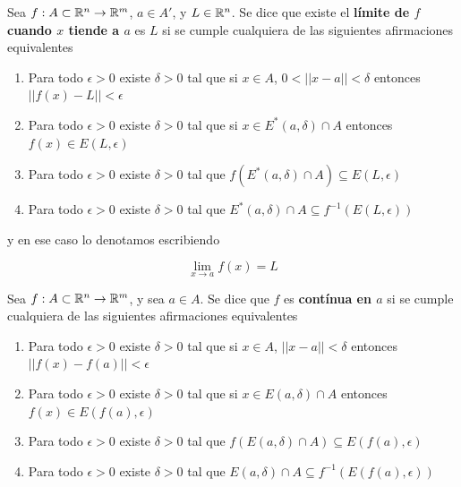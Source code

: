 \begin{definition}[Límite]
Sea $f : A \subset \mathbb{R}^n \to \mathbb{R}^m$, $ a \in A'$, y $L \in \mathbb{R}^n$.  Se dice que existe el \textbf{límite de $f$ cuando $x$ tiende a $a$}  es $L$ si se cumple cualquiera de las siguientes afirmaciones equivalentes

\begin{enumerate} 

\item Para todo $\epsilon > 0$ existe $\delta > 0$ tal que si $x \in A$, $0 < ||x-a|| < \delta$ entonces $||f(x) - L|| < \epsilon$

\item Para todo $\epsilon > 0$ existe $\delta > 0$ tal que si $x \in E^*(a,\delta) \cap A$ entonces $f(x) \in E(L,\epsilon)$

\item Para todo $\epsilon > 0$ existe $\delta > 0$ tal que $f(E^*(a,\delta) \cap A) \subseteq E(L,\epsilon)$

\item Para todo $\epsilon > 0$ existe $\delta > 0$ tal que $E^*(a,\delta) \cap A \subseteq f^{-1}(E(L,\epsilon))$

\end{enumerate}

y en ese caso lo denotamos escribiendo

$$ \displaystyle \lim_{x \to a} f(x) = L $$

\end{definition}


\begin{definition}[Continuidad]
Sea $ f: A \subset \mathbb{R}^n \to \mathbb{R}^m$, y sea $a \in A$.  Se dice que $f$ es \textbf{contínua en $a$}  si se cumple cualquiera de las siguientes afirmaciones equivalentes

\begin{enumerate} 
\item Para todo $\epsilon > 0$ existe $\delta > 0$ tal que si $x \in A$, $||x-a|| < \delta$ entonces $||f(x) - f(a)|| < \epsilon$

\item Para todo $\epsilon > 0$ existe $\delta > 0$ tal que si $x \in E(a,\delta) \cap A$ entonces $f(x) \in E(f(a),\epsilon)$

\item Para todo $\epsilon > 0$ existe $\delta > 0$ tal que $f(E(a,\delta) \cap A) \subseteq E(f(a),\epsilon)$

\item Para todo $\epsilon > 0$ existe $\delta > 0$ tal que $E(a,\delta) \cap A \subseteq f^{-1}(E(f(a),\epsilon))$
\end{enumerate}
\end{definition}

